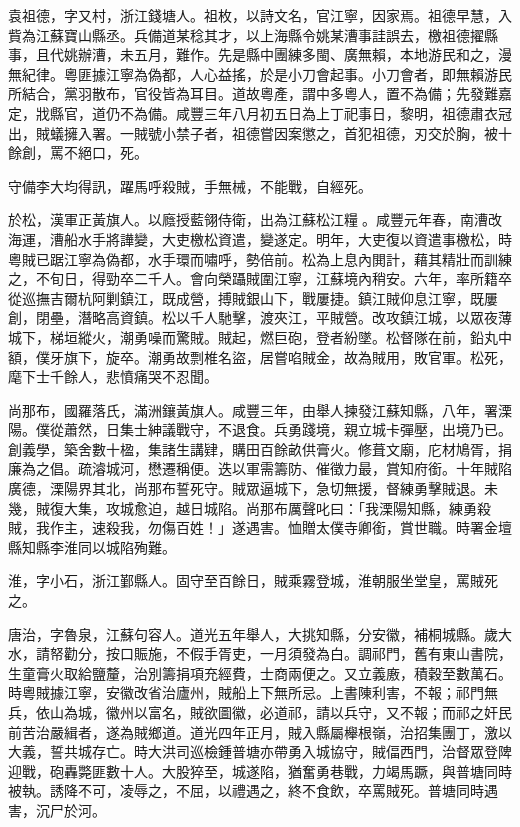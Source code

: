 \begin{pinyinscope}
袁祖德，字又村，浙江錢塘人。祖枚，以詩文名，官江寧，因家焉。祖德早慧，入貲為江蘇寶山縣丞。兵備道某稔其才，以上海縣令姚某漕事詿誤去，檄祖德擢縣事，且代姚辦漕，未五月，難作。先是縣中團練多閩、廣無賴，本地游民和之，漫無紀律。粵匪據江寧為偽都，人心益搖，於是小刀會起事。小刀會者，即無賴游民所結合，黨羽散布，官役皆為耳目。道故粵產，謂中多粵人，置不為備；先發難嘉定，戕縣官，道仍不為備。咸豐三年八月初五日為上丁祀事日，黎明，祖德肅衣冠出，賊蟻擁入署。一賊號小禁子者，祖德嘗因案懲之，首犯祖德，刃交於胸，被十餘創，罵不絕口，死。

守備李大均得訊，躍馬呼殺賊，手無械，不能戰，自經死。

於松，漢軍正黃旗人。以廕授藍翎侍衛，出為江蘇松江糧。咸豐元年春，南漕改海運，漕船水手將譁變，大吏檄松資遣，變遂定。明年，大吏復以資遣事檄松，時粵賊已踞江寧為偽都，水手環而嘯呼，勢倍前。松為上息內閧計，藉其精壯而訓練之，不旬日，得勁卒二千人。會向榮躡賊圍江寧，江蘇境內稍安。六年，率所籍卒從巡撫吉爾杭阿剿鎮江，既成營，搏賊銀山下，戰屢捷。鎮江賊仰息江寧，既屢創，閉壘，潛略高資鎮。松以千人馳擊，渡夾江，平賊營。改攻鎮江城，以眾夜薄城下，梯垣縱火，潮勇噪而驚賊。賊起，燃巨砲，登者紛墜。松督隊在前，鉛丸中額，僕牙旗下，旋卒。潮勇故剽椎名盜，居嘗啗賊金，故為賊用，敗官軍。松死，麾下士千餘人，悲憤痛哭不忍聞。

尚那布，國羅落氏，滿洲鑲黃旗人。咸豐三年，由舉人揀發江蘇知縣，八年，署溧陽。僕從蕭然，日集士紳議戰守，不退食。兵勇踐境，親立城卡彈壓，出境乃已。創義學，築舍數十楹，集諸生講肄，購田百餘畝供膏火。修葺文廟，庀材鳩胥，捐廉為之倡。疏濬城河，懋遷稱便。迭以軍需籌防、催徵力最，賞知府銜。十年賊陷廣德，溧陽界其北，尚那布誓死守。賊眾逼城下，急切無援，督練勇擊賊退。未幾，賊復大集，攻城愈迫，越日城陷。尚那布厲聲叱曰：「我溧陽知縣，練勇殺賊，我作主，速殺我，勿傷百姓！」遂遇害。恤贈太僕寺卿銜，賞世職。時署金壇縣知縣李淮同以城陷殉難。

淮，字小石，浙江鄞縣人。固守至百餘日，賊乘霧登城，淮朝服坐堂皇，罵賊死之。

唐治，字魯泉，江蘇句容人。道光五年舉人，大挑知縣，分安徽，補桐城縣。歲大水，請帑勸分，按口賑施，不假手胥吏，一月須發為白。調祁門，舊有東山書院，生童膏火取給鹽釐，治別籌捐項充經費，士商兩便之。又立義廒，積穀至數萬石。時粵賊據江寧，安徽改省治廬州，賊船上下無所忌。上書陳利害，不報；祁門無兵，依山為城，徽州以富名，賊欲圖徽，必道祁，請以兵守，又不報；而祁之奸民前苦治嚴緝者，遂為賊鄉道。道光四年正月，賊入縣屬櫸根嶺，治招集團丁，激以大義，誓共城存亡。時大洪司巡檢鍾普塘亦帶勇入城協守，賊偪西門，治督眾登陴迎戰，砲轟斃匪數十人。大股猝至，城遂陷，猶奮勇巷戰，力竭馬蹶，與普塘同時被執。誘降不可，凌辱之，不屈，以禮遇之，終不食飲，卒罵賊死。普塘同時遇害，沉尸於河。


\end{pinyinscope}
